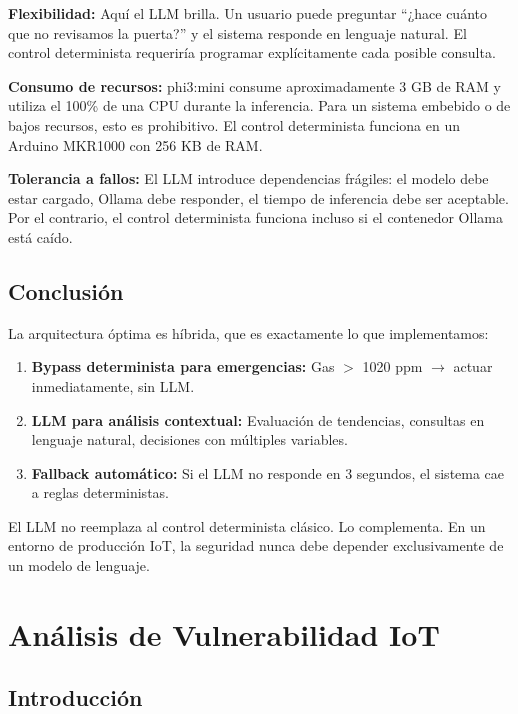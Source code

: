 \documentclass[12pt,letterpaper]{article}
\begin{document}
\textbf{Flexibilidad:} Aquí el LLM brilla. Un usuario puede preguntar ``¿hace cuánto que no revisamos la puerta?'' y el sistema responde en lenguaje natural. El control determinista requeriría programar explícitamente cada posible consulta.

\textbf{Consumo de recursos:} phi3:mini consume aproximadamente 3 GB de RAM y utiliza el 100\% de una CPU durante la inferencia. Para un sistema embebido o de bajos recursos, esto es prohibitivo. El control determinista funciona en un Arduino MKR1000 con 256 KB de RAM.

\textbf{Tolerancia a fallos:} El LLM introduce dependencias frágiles: el modelo debe estar cargado, Ollama debe responder, el tiempo de inferencia debe ser aceptable. Por el contrario, el control determinista funciona incluso si el contenedor Ollama está caído.

\subsection{Conclusión}

La arquitectura óptima es híbrida, que es exactamente lo que implementamos:

\begin{enumerate}
    \item \textbf{Bypass determinista para emergencias:} Gas $>$ 1020 ppm $\rightarrow$ actuar inmediatamente, sin LLM.
    \item \textbf{LLM para análisis contextual:} Evaluación de tendencias, consultas en lenguaje natural, decisiones con múltiples variables.
    \item \textbf{Fallback automático:} Si el LLM no responde en 3 segundos, el sistema cae a reglas deterministas.
\end{enumerate}

El LLM no reemplaza al control determinista clásico. Lo complementa. En un entorno de producción IoT, la seguridad nunca debe depender exclusivamente de un modelo de lenguaje.

\newpage

\section{Análisis de Vulnerabilidad IoT}

\subsection{Introducción}
\end{document}
